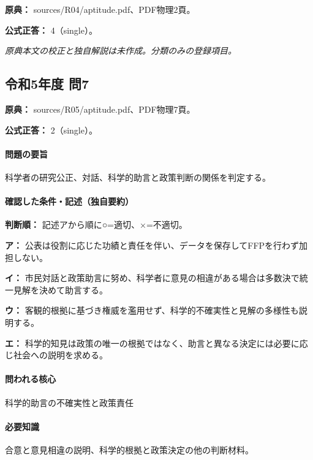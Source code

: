 \noindent\textbf{原典：} sources/R04/aptitude.pdf、PDF物理2頁。

\textbf{公式正答：} 4（single）。

\par\textit{原典本文の校正と独自解説は未作成。分類のみの登録項目。}

\subsection{令和5年度 問7}
\label{q:r05-reg-apt-07}

\noindent\textbf{原典：} sources/R05/aptitude.pdf、PDF物理7頁。

\textbf{公式正答：} 2（single）。

\paragraph{問題の要旨} 科学者の研究公正、対話、科学的助言と政策判断の関係を判定する。

\paragraph{確認した条件・記述（独自要約）}\mbox{}\par

\noindent\textbf{判断順：} 記述アから順に○=適切、×=不適切。\par

\noindent\textbf{ア：} 公表は役割に応じた功績と責任を伴い、データを保存してFFPを行わず加担しない。\par

\noindent\textbf{イ：} 市民対話と政策助言に努め、科学者に意見の相違がある場合は多数決で統一見解を決めて助言する。\par

\noindent\textbf{ウ：} 客観的根拠に基づき権威を濫用せず、科学的不確実性と見解の多様性も説明する。\par

\noindent\textbf{エ：} 科学的知見は政策の唯一の根拠ではなく、助言と異なる決定には必要に応じ社会への説明を求める。\par

\paragraph{問われる核心} 科学的助言の不確実性と政策責任

\paragraph{必要知識} 合意と意見相違の説明、科学的根拠と政策決定の他の判断材料。

